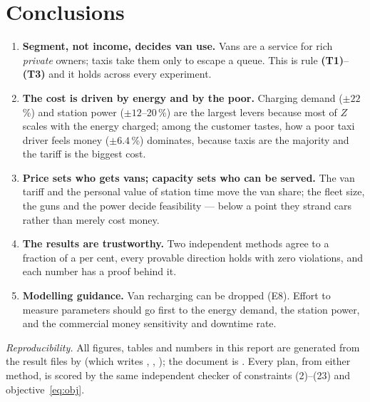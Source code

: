 \section{Conclusions}
\label{sec:concl}
\begin{enumerate}
  \item \textbf{Segment, not income, decides van use.} Vans are a service for rich \emph{private} owners; taxis
  take them only to escape a queue. This is rule \textbf{(T1)}--\textbf{(T3)} and it holds across every experiment.
  \item \textbf{The cost is driven by energy and by the poor.} Charging demand ($\pm22$\,\%) and station power
  ($\pm12$--20\,\%) are the largest levers because most of $Z$ scales with the energy charged; among the customer
  tastes, how a poor taxi driver feels money ($\pm6.4$\,\%) dominates, because taxis are the majority and the
  tariff is the biggest cost.
  \item \textbf{Price sets who gets vans; capacity sets who can be served.} The van tariff and the personal value
  of station time move the van share; the fleet size, the guns and the power decide feasibility --- below a point
  they strand cars rather than merely cost money.
  \item \textbf{The results are trustworthy.} Two independent methods agree to a fraction of a per cent, every
  provable direction holds with zero violations, and each number has a proof behind it.
  \item \textbf{Modelling guidance.} Van recharging can be dropped (E8). Effort to measure parameters should go
  first to the energy demand, the station power, and the commercial money sensitivity and downtime rate.
\end{enumerate}


\vfill
{\footnotesize\emph{Reproducibility.} All figures, tables and numbers in this report are generated from the result
files by  (which writes , , );
the document is . Every plan, from either method, is scored by the same
independent checker of constraints (2)--(23) and objective~\eqref{eq:obj}.}

